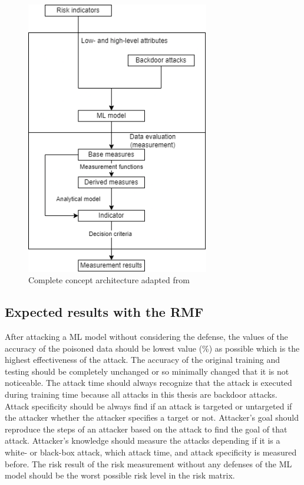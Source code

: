 \begin{figure}[ht!]
  \centering
  \includegraphics[width=8cm]{pictures/complete_architecture.png}
  \caption{Complete concept architecture adapted from \cite{ISO_27004_2009}}
  \label{fig:complete_architecture}
\end{figure}

\subsection{Expected results with the RMF}

After attacking a ML model without considering the defense, the values of the accuracy of the poisoned data should be lowest value (\%) as possible which is the highest effectiveness of the attack. The accuracy of the original training and testing should be completely unchanged or so minimally changed that it is not noticeable. The attack time should always recognize that the attack is executed during training time because all attacks in this thesis are backdoor attacks. Attack specificity should be always find if an attack is targeted or untargeted if the attacker whether the attacker specifies a target or not. Attacker's goal should reproduce the steps of an attacker based on the attack to find the goal of that attack. Attacker's knowledge should measure the attacks depending if it is a white- or black-box attack, which attack time, and attack specificity is measured before. The risk result of the risk measurement without any defenses of the ML model should be the worst possible risk level in the risk matrix.
